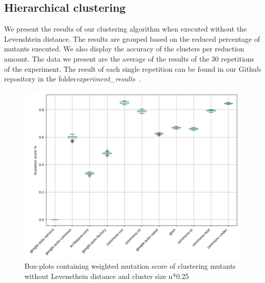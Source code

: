 \documentclass[conference,draftclsnofoot,onecolumn]{IEEEtran}
\begin{document}
\subsection{Hierarchical clustering}
We present the results of our clustering algorithm when executed without the Levenshtein distance.
The results are grouped based on the reduced percentage of mutants executed.
We also display the accuracy of the clusters per reduction amount.
The data we present are the average of the results of the 30 repetitions of the experiment.
The result of each single repetition can be found in our Github repository in the folder\textit{experiment{\_}results}~\cite{rbasarat-repo}.


\begin{figure}[ht]
\includegraphics[width=0.5 \textwidth]{images/boxplot_summary/boxplot_hc_no_distance_0.25.png}
\caption{\label{box:clustering_no_distance_25}Box-plots containing weighted mutation score of clustering mutants without Levensthein distance and cluster size n*0.25}
\end{figure}
\end{document}
